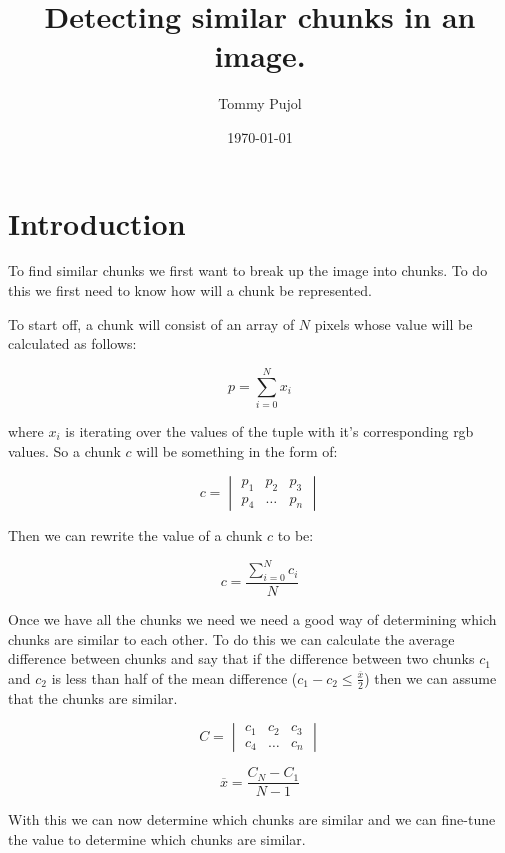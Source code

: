 \documentclass{article}
\title{Detecting similar chunks in an image.}
\author{Tommy Pujol}
\date{\today}
\begin{document}
\maketitle

\section{Introduction}

To find similar chunks we first want to break up the image into chunks.
To do this we first need to know how will a chunk be represented.

To start off, a chunk will consist of an array of $N$ pixels whose value will be
calculated as follows:

\begin{equation}
	p = \sum_{i=0}^{N} x_i
\end{equation}

where $x_i$ is iterating over the values of the tuple with it's corresponding rgb
values. So a chunk $c$ will be something in the form of:

\begin{equation}
	c = \begin{vmatrix}
		p_1 & p_2 & p_3 \\
		p_4 & \dots & p_n
	\end{vmatrix}
\end{equation}

Then we can rewrite the value of a chunk $c$ to be:

\begin{equation}
	c = \frac{\sum\limits_{i=0}^{N} c_i}{N}
\end{equation}

Once we have all the chunks we need we need a good way of determining which chunks
are similar to each other. To do this we can calculate the average difference between
chunks and say that if the difference between two chunks $c_1$ and $c_2$ is less than
half of the mean difference ($c_1 - c_2 \leq \frac{\overline{x}}{2}$) then we can assume
that the chunks are similar.

\begin{equation}
	C = \begin{vmatrix}
		c_1 & c_2 & c_3 \\
		c_4 & \dots & c_n
	\end{vmatrix}
\end{equation}

\begin{equation}
	\overline{x} = \frac{C_N - C_1}{N - 1}
\end{equation}


With this we can now determine which chunks are similar and we can fine-tune the value
to determine which chunks are similar.
\end{document}
